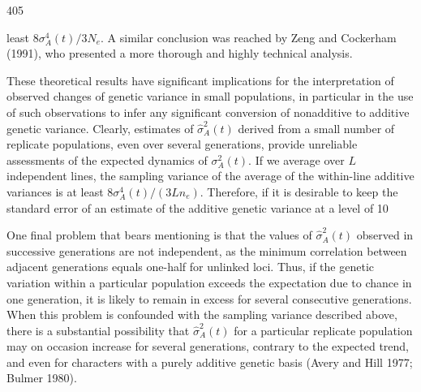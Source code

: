 \documentclass{article}
\begin{document}
405

least  $ 8\sigma_A^4(t)/3N_e $. A similar conclusion was reached by Zeng and Cockerham (1991), who presented a more thorough and highly technical analysis.

These theoretical results have significant implications for the interpretation of observed changes of genetic variance in small populations, in particular in the use of such observations to infer any significant conversion of nonadditive to additive genetic variance. Clearly, estimates of  $ \widehat{\sigma}_{A}^{2}(t) $ derived from a small number of replicate populations, even over several generations, provide unreliable assessments of the expected dynamics of  $ \sigma_{A}^{2}(t) $. If we average over  $ L $ independent lines, the sampling variance of the average of the within-line additive variances is at least  $ 8\sigma_{A}^{4}(t)/(3Ln_{e}) $. Therefore, if it is desirable to keep the standard error of an estimate of the additive genetic variance at a level of 10%

One final problem that bears mentioning is that the values of  $ \hat{\sigma}_A^2(t) $ observed in successive generations are not independent, as the minimum correlation between adjacent generations equals one-half for unlinked loci. Thus, if the genetic variation within a particular population exceeds the expectation due to chance in one generation, it is likely to remain in excess for several consecutive generations. When this problem is confounded with the sampling variance described above, there is a substantial possibility that  $ \hat{\sigma}_A^2(t) $ for a particular replicate population may on occasion increase for several generations, contrary to the expected trend, and even for characters with a purely additive genetic basis (Avery and Hill 1977; Bulmer 1980).
\end{document}
